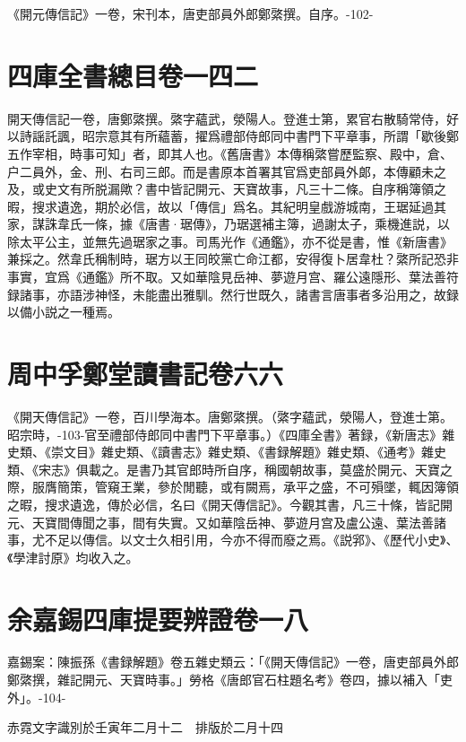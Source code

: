 \documentclass[UTF8,scheme=chinese]{ctexbook}
\newcommand{\pagenum}{\footnotesize\heiti\color{red}}
\begin{document}
《開元傳信記》一卷，宋刊本，唐吏部員外郎鄭綮撰。自序。{\pagenum -102-}

\section{四庫全書總目卷一四二}

開天傳信記一卷，唐鄭綮撰。綮字蘊武，滎陽人。登進士第，累官右散騎常侍，好以詩謡託諷，昭宗意其有所蘊蓄，擢爲禮部侍郎同中書門下平章事，所謂「歇後鄭五作宰相，時事可知」者，即其人也。《舊唐書》本傳稱綮嘗歷監察、殿中，倉、户二員外，金、刑、右司三郎。而是書原本首署其官爲吏部員外郞，本傳顧未之及，或史文有所脱漏歟？書中皆記開元、天寶故事，凡三十二條。自序稱簿領之暇，搜求遺逸，期於必信，故以「傳信」爲名。其紀明皇戲游城南，王琚延過其家，謀誅韋氏一條，據《唐書·琚傳》，乃琚選補主簿，過謝太子，乘機進説，以除太平公主，並無先過琚家之事。司馬光作《通鑑》，亦不從是書，惟《新唐書》兼採之。然韋氏稱制時，琚方以王同皎黨亡命江都，安得復卜居韋杜？綮所記恐非事實，宜爲《通鑑》所不取。又如華陰見岳神、夢遊月宫、羅公遠隱形、葉法善符録諸事，亦語涉神怪，未能盡出雅馴。然行世既久，諸書言唐事者多沿用之，故録以備小説之一種焉。

\section{周中孚鄭堂讀書記卷六六}

《開天傳信記》一卷，百川學海本。唐鄭綮撰。（綮字蘊武，滎陽人，登進士第。昭宗時，{\pagenum -103-}官至禮部侍郎同中書門下平章事。）《四庫全書》著録，《新唐志》雜史類、《崇文目》雜史類、《讀書志》雜史類、《書録解題》雜史類、《通考》雜史類、《宋志》俱載之。是書乃其官郎時所自序，稱國朝故事，莫盛於開元、天寶之際，服膺簡策，管窺王業，參於閒聽，或有闕焉，承平之盛，不可殞墜，輒因簿領之暇，搜求遺逸，傳於必信，名曰《開天傳信記》。今觀其書，凡三十條，皆記開元、天寶間傳聞之事，間有失實。又如華陰岳神、夢遊月宫及盧公遠、葉法善諸事，尤不足以傳信。以文士久相引用，今亦不得而廢之焉。《説郛》、《歷代小史》、《學津討原》均收入之。

\section{余嘉錫四庫提要辨證卷一八}

嘉錫案：陳振孫《書録解題》卷五雜史類云：「《開天傳信記》一卷，唐吏部員外郎鄭綮撰，雜記開元、天寶時事。」勞格《唐郎官石柱題名考》卷四，據以補入「吏外」。{\pagenum -104-}

\vfill

\noindent 赤霓文字識別於壬寅年二月十二　排版於二月十四
\end{document}
